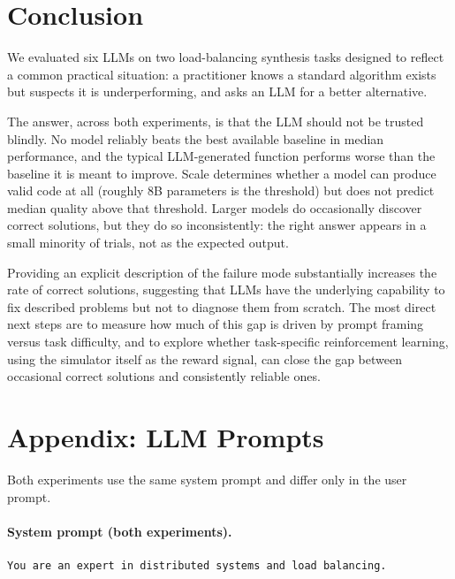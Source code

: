 \documentclass[11pt]{article}
\begin{document}
\section{Conclusion}
\label{sec:conclusion}

We evaluated six LLMs on two load-balancing synthesis tasks designed
to reflect a common practical situation: a practitioner knows a
standard algorithm exists but suspects it is underperforming, and
asks an LLM for a better alternative.

The answer, across both experiments, is that the LLM should not be
trusted blindly.
No model reliably beats the best available baseline in median
performance, and the typical LLM-generated function performs worse
than the baseline it is meant to improve.
Scale determines whether a model can produce valid code at all
(roughly 8B parameters is the threshold) but does not predict
median quality above that threshold.
Larger models do occasionally discover correct solutions, but they
do so inconsistently: the right answer appears in a small minority
of trials, not as the expected output.

Providing an explicit description of the failure mode substantially
increases the rate of correct solutions, suggesting that LLMs have
the underlying capability to fix described problems but not to
diagnose them from scratch.
The most direct next steps are to measure how much of this gap is
driven by prompt framing versus task difficulty, and to explore
whether task-specific reinforcement learning, using the simulator
itself as the reward signal, can close the gap between occasional
correct solutions and consistently reliable ones.

\newpage



\appendix
\section{Appendix: LLM Prompts}
\label{app:prompts}

Both experiments use the same system prompt and differ only in the user prompt.

\paragraph{System prompt (both experiments).}
\begin{lstlisting}
You are an expert in distributed systems and load balancing.
\end{lstlisting}
\end{document}
